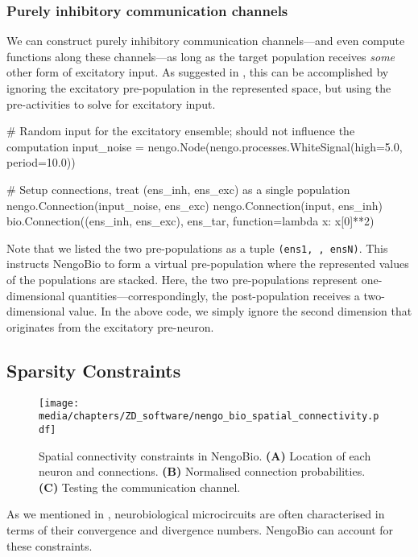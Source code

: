 \subsubsection{Purely inhibitory communication channels}
We can construct purely inhibitory communication channels---and even compute functions along these channels---as long as the target population receives \emph{some} other form of excitatory input.
As suggested in , this can be accomplished by ignoring the excitatory pre-population in the represented space, but using the pre-activities to solve for excitatory input.
\begin{pythoncode}
# Random input for the excitatory ensemble; should not influence the computation
input_noise = nengo.Node(nengo.processes.WhiteSignal(high=5.0, period=10.0))

# Setup connections, treat (ens_inh, ens_exc) as a single population
nengo.Connection(input_noise, ens_exc)
nengo.Connection(input, ens_inh)
bio.Connection((ens_inh, ens_exc), ens_tar, function=lambda x: x[0]**2)
\end{pythoncode}
Note that we listed the two pre-populations as a tuple \texttt{(ens1, \textellipsis, ensN)}.
This instructs NengoBio to form a virtual pre-population where the represented values of the populations are stacked.
Here, the two pre-populations represent one-dimensional quantities---correspondingly, the post-population receives a two-dimensional value.
In the above code, we simply ignore the second dimension that originates from the excitatory pre-neuron.

\subsection{Sparsity Constraints}
\label{sec:nengo_bio_sparsity}

\begin{figure}
	\centering
	\texttt{[image: media/chapters/ZD\_software/nengo\_bio\_spatial\_connectivity.pdf]}
	\caption[Spatial connectivity constraints in NengoBio]{
		Spatial connectivity constraints in NengoBio.
		\textbf{(A)} Location of each neuron and connections.
		\textbf{(B)} Normalised connection probabilities.
		\textbf{(C)} Testing the communication channel.
	}
	\label{fig:nengo_bio_spatial_connectivity}
\end{figure}

As we mentioned in , neurobiological microcircuits are often characterised in terms of their convergence and divergence numbers.
NengoBio can account for these constraints.

